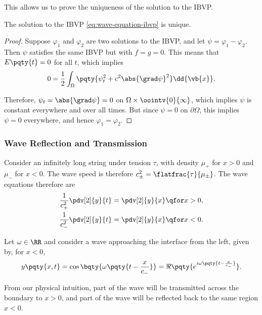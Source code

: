 {This allows us to prove the uniqueness of the solution to the IBVP.

\begin{proposition}
    The solution to the IBVP \eqref{eq:wave-equation-ibvp} is unique.
\end{proposition}

\begin{proof}
    Suppose \(\varphi_1\) and \(\varphi_2\) are two solutions to the IBVP, and let \(\psi = \varphi_1 - \varphi_2\). Then \(\psi\) satisfies the same IBVP but with \(f = g = 0\). This means that \(E\pqty{t} = 0\) for all \(t\), which implies
    \begin{equation}
        0 = \frac{1}{2} \int_{\Omega} \pqty{\psi_t^2 + c^2 \abs{\grad \psi}^2} \dd{\vb{x}}.
    \end{equation}

    Therefore, \(\psi_t = \abs{\grad \psi} = 0\) on \(\Omega \times \oointv{0}{\infty}\), which implies \(\psi\) is constant everywhere and over all times. But since \(\psi = 0\) on \(\partial \Omega\), this implies \(\psi = 0\) everywhere, and hence \(\varphi_1 = \varphi_2\).
\end{proof}

\subsubsection{Wave Reflection and Transmission}

Consider an infinitely long string under tension \(\tau\), with density \(\mu_+\) for \(x > 0\) and \(\mu_-\) for \(x < 0\). The wave speed is therefore \(c_\pm^2 = \flatfrac{\tau}{\mu_\pm}\). The wave equations therefore are
\begin{subequations}
    \begin{align}
        \frac{1}{c_+^2} \pdv[2]{y}{t} = \pdv[2]{y}{x} &\qfor x > 0, \\
        \frac{1}{c_-^2} \pdv[2]{y}{t} = \pdv[2]{y}{x} &\qfor x < 0.
    \end{align}
\end{subequations}

Let \(\omega \in \RR\) and consider a wave approaching the interface from the left, given by, for \(x < 0\),
\begin{equation}
    y\pqty{x, t} = \cos \bqty{\omega \pqty{t - \frac{x}{c_-}}} = \Re \pqty{e^{i \omega \pqty{t - \frac{x}{c_-}}}}.
\end{equation}

From our physical intuition, part of the wave will be transmitted across the boundary to \(x > 0\), and part of the wave will be reflected back to the same region \(x < 0\).

}
